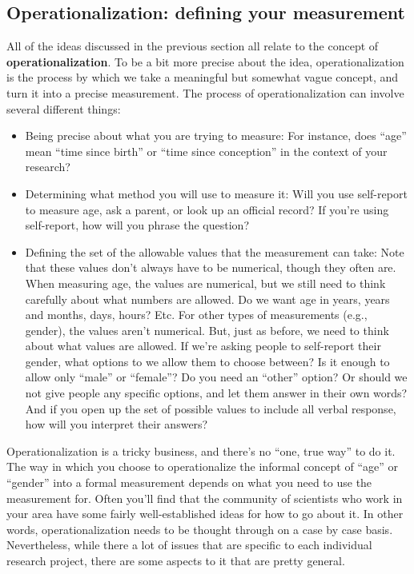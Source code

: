 \documentclass[
]{book}
\begin{document}
\hypertarget{operationalization-defining-your-measurement}{%
\subsection{Operationalization: defining your measurement}\label{operationalization-defining-your-measurement}}

All of the ideas discussed in the previous section all relate to the concept of \textbf{operationalization}. To be a bit more precise about the idea, operationalization is the process by which we take a meaningful but somewhat vague concept, and turn it into a precise measurement. The process of operationalization can involve several different things:

\begin{itemize}
\item
  Being precise about what you are trying to measure: For instance, does ``age'' mean ``time since birth'' or ``time since conception'' in the context of your research?
\item
  Determining what method you will use to measure it: Will you use self-report to measure age, ask a parent, or look up an official record? If you're using self-report, how will you phrase the question?
\item
  Defining the set of the allowable values that the measurement can take: Note that these values don't always have to be numerical, though they often are. When measuring age, the values are numerical, but we still need to think carefully about what numbers are allowed. Do we want age in years, years and months, days, hours? Etc. For other types of measurements (e.g., gender), the values aren't numerical. But, just as before, we need to think about what values are allowed. If we're asking people to self-report their gender, what options to we allow them to choose between? Is it enough to allow only ``male'' or ``female''? Do you need an ``other'' option? Or should we not give people any specific options, and let them answer in their own words? And if you open up the set of possible values to include all verbal response, how will you interpret their answers?
\end{itemize}

Operationalization is a tricky business, and there's no ``one, true way'' to do it. The way in which you choose to operationalize the informal concept of ``age'' or ``gender'' into a formal measurement depends on what you need to use the measurement for. Often you'll find that the community of scientists who work in your area have some fairly well-established ideas for how to go about it. In other words, operationalization needs to be thought through on a case by case basis. Nevertheless, while there a lot of issues that are specific to each individual research project, there are some aspects to it that are pretty general.
\end{document}
